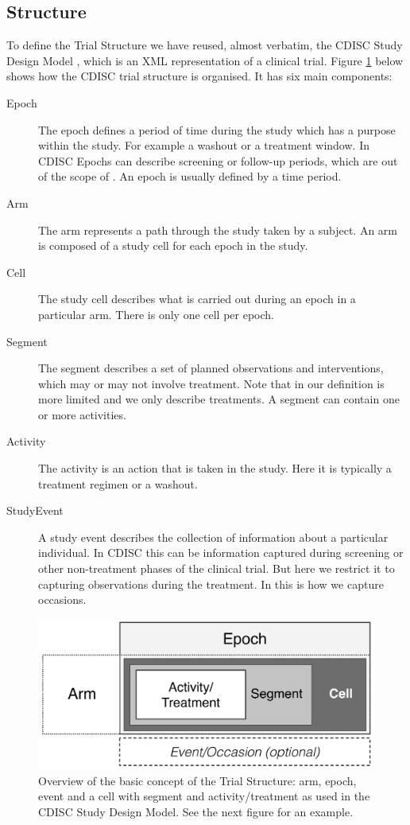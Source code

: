 \subsection{Structure}
\label{subsec:TrialStructure}

To define the Trial Structure we have reused, almost verbatim, the
CDISC Study Design Model \cite{CDISC:2011a}, which is an
XML representation of a clinical trial. Figure \ref{fig:CellSegmentEpochArmEvent_concept}
below shows how the CDISC trial structure is organised. It has six main components:
\begin{description}
\item[Epoch] The epoch defines a period of time during the study which
  has a purpose within the study. For example a washout or a treatment
  window. In CDISC Epochs can describe screening or follow-up periods,
  which are out of the scope of \pharmml. An epoch is usually defined
  by a time period.
\item[Arm] The arm represents a path through the study taken by a
  subject. An arm is composed of a study cell for each epoch in the study.
\item[Cell] The study cell describes what is carried out during an
  epoch in a particular arm. There is only one cell per epoch.
\item[Segment] The segment describes a set of planned observations and
  interventions, which may or may not involve treatment. Note that in
  \pharmml our definition is more limited and we only describe
  treatments. A segment can contain one or more activities.
\item[Activity] The activity is an action that is taken in the
  study. Here it is typically a treatment regimen or a washout.
\item[StudyEvent] A study event describes the collection of
  information about a particular individual. In CDISC this can be
  information captured during screening or other non-treatment phases
  of the clinical trial. But here we restrict it to capturing
  observations during the treatment. In \pharmml this is how we
  capture occasions.
\end{description}
\begin{figure}[htb]
\centering
\includegraphics[height=0.2\textheight]{pics/CellSegmentEpochArmEvent_concept}%
\caption{Overview of the basic concept of the Trial Structure: arm,
epoch, event and a cell with segment and activity/treatment as used in the CDISC Study
  Design Model. See the next figure for an example.}
\label{fig:CellSegmentEpochArmEvent_concept}
\end{figure}
